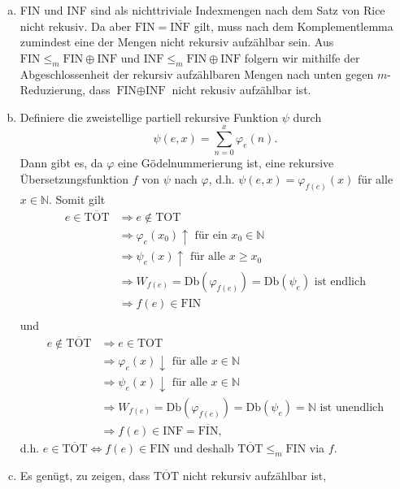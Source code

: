 \documentclass[german,headsepline]{scrartcl}
\begin{document}
	\begin{solution}
		\begin{enumerate}[(a)]
			\item FIN und INF sind als nichttriviale Indexmengen nach dem Satz von Rice nicht rekusiv.
				Da aber $\text{FIN}=\overline{\text{INF}}$ gilt,
				muss nach dem Komplementlemma zumindest eine der Mengen nicht rekursiv aufzählbar sein.
				Aus $\text{FIN}\leq_m\text{FIN}\oplus\text{INF}$ und $\text{INF}\leq_m\text{FIN}\oplus\text{INF}$
				folgern wir mithilfe der Abgeschlossenheit der rekursiv aufzählbaren Mengen nach unten gegen $m$-Reduzierung,
				dass $\text{FIN}\oplus\text{INF}$ nicht rekusiv aufzählbar ist.
			\item Definiere die zweistellige partiell rekursive Funktion $\psi$ durch
				\[\psi(e,x)=\sum_{n=0}^{x}\varphi_e(n).\]
				Dann gibt es, da $\varphi$ eine Gödelnummerierung ist,
				eine rekursive Übersetzungsfunktion $f$ von $\psi$ nach $\varphi$,
				d.h. $\psi(e,x)=\varphi_{f(e)}(x)$ für alle $x\in\mathbb{N}$.
				Somit gilt \begin{align*}
					e\in\overline{\text{TOT}}
					&\Rightarrow e\not\in\text{TOT} \\
					&\Rightarrow\varphi_e(x_0)\uparrow\text{ für ein }x_0\in\mathbb{N} \\
					&\Rightarrow\psi_e(x)\uparrow\text{ für alle }x\geq x_0 \\
					&\Rightarrow W_{f(e)}=\text{Db}(\varphi_{f(e)})=\text{Db}(\psi_e)\text{ ist endlich} \\
					&\Rightarrow f(e)\in\text{FIN} \\
				\end{align*} und \begin{align*}
					e\not\in\overline{\text{TOT}}
					&\Rightarrow e\in\text{TOT} \\
					&\Rightarrow\varphi_e(x)\downarrow\text{ für alle }x\in\mathbb{N} \\
					&\Rightarrow\psi_e(x)\downarrow\text{ für alle }x\in\mathbb{N} \\
					&\Rightarrow W_{f(e)}=\text{Db}(\varphi_{f(e)})=\text{Db}(\psi_e)=\mathbb{N} \text{ ist unendlich} \\
					&\Rightarrow f(e)\in\text{INF}=\overline{\text{FIN}},
				\end{align*}
				d.h. $e\in\overline{\text{TOT}}\Leftrightarrow f(e)\in\text{FIN}$
				und deshalb $\overline{\text{TOT}}\leq_m\text{FIN}$ via $f$.
			\item Es genügt, zu zeigen, dass $\overline{\text{TOT}}$ nicht rekursiv aufzählbar ist,

\end{enumerate}
\end{solution}
\end{document}
